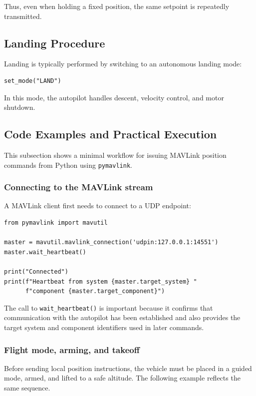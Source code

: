 Thus, even when holding a fixed position, the same setpoint is repeatedly transmitted.

\subsection{Landing Procedure}

Landing is typically performed by switching to an autonomous landing mode:

\begin{verbatim}
set_mode("LAND")
\end{verbatim}

In this mode, the autopilot handles descent, velocity control, and motor shutdown.

\subsection{Code Examples and Practical Execution}

This subsection shows a minimal workflow for issuing MAVLink position commands from Python using \texttt{pymavlink}. 

\subsubsection{Connecting to the MAVLink stream}

A MAVLink client first needs to connect to a UDP endpoint:

\begin{verbatim}
from pymavlink import mavutil

master = mavutil.mavlink_connection('udpin:127.0.0.1:14551')
master.wait_heartbeat()

print("Connected")
print(f"Heartbeat from system {master.target_system} "
      f"component {master.target_component}")
\end{verbatim}

The call to \texttt{wait\_heartbeat()} is important because it confirms that communication with the autopilot has been established and also provides the target system and component identifiers used in later commands.

\subsubsection{Flight mode, arming, and takeoff}

Before sending local position instructions, the vehicle must be placed in a guided mode, armed, and lifted to a safe altitude. The following example reflects the same sequence.


